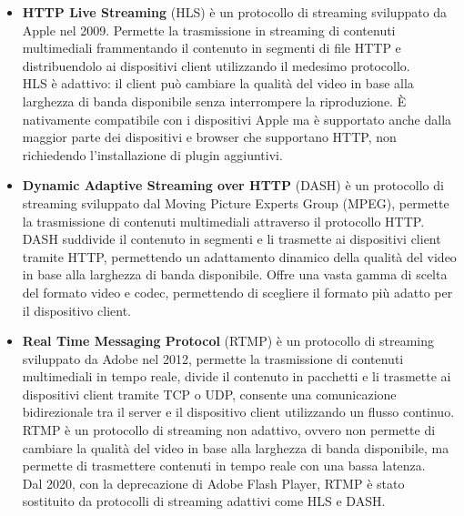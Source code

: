 \begin{itemize}

    \item \textbf{HTTP Live Streaming} (HLS) è un protocollo di streaming sviluppato da Apple nel 2009. Permette la trasmissione in streaming di contenuti multimediali frammentando il contenuto in segmenti di file HTTP e distribuendolo ai dispositivi client utilizzando il medesimo protocollo.\\
    HLS è adattivo: il client può cambiare la qualità del video in base alla larghezza di banda disponibile senza interrompere la riproduzione.
    È nativamente compatibile con i dispositivi Apple ma è supportato anche dalla maggior parte dei dispositivi e browser che supportano HTTP, non richiedendo l'installazione di plugin aggiuntivi.\\

    \item \textbf{Dynamic Adaptive Streaming over HTTP} (DASH) è un protocollo di streaming sviluppato dal Moving Picture Experts Group (MPEG), permette la trasmissione di contenuti multimediali
    attraverso il protocollo HTTP.\\
    DASH suddivide il contenuto in segmenti e li trasmette ai dispositivi client tramite HTTP, permettendo un adattamento dinamico della qualità del video in base alla larghezza di banda disponibile.
    Offre una vasta gamma di scelta del formato video e codec, permettendo di scegliere il formato più adatto per il dispositivo client.\\

    \item \textbf{Real Time Messaging Protocol} (RTMP) è un protocollo di streaming sviluppato da Adobe nel 2012, permette la trasmissione di contenuti multimediali in tempo reale,
    divide il contenuto in pacchetti e li trasmette ai dispositivi client tramite TCP o UDP, consente una comunicazione bidirezionale tra il server e il dispositivo client utilizzando un flusso continuo.\\
    RTMP è un protocollo di streaming non adattivo, ovvero non permette di cambiare la qualità del video in base alla larghezza di banda disponibile, ma permette di 
    trasmettere contenuti in tempo reale con una bassa latenza.\\
    Dal 2020, con la deprecazione di Adobe Flash Player, RTMP è stato sostituito da protocolli di streaming adattivi come HLS e DASH.\\
    \end{itemize}

